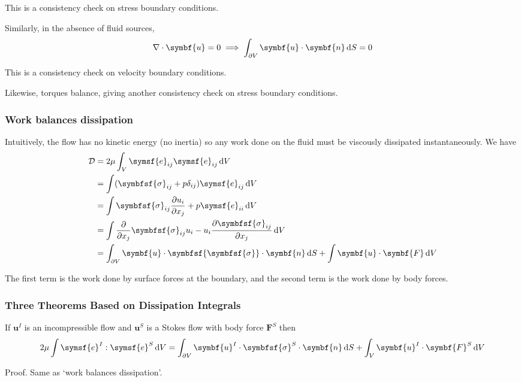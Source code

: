 \documentclass{jknotes}
\begin{document}
This is a consistency check on stress boundary conditions. 

Similarly, in the absence of fluid sources,
\begin{equation}
	\nabla \cdot \symbf{u} = 0 \implies \int_{\partial V} \symbf{u} \cdot \symbf{n} \,
	\diffd S = 0
\end{equation}

This is a consistency check on velocity boundary conditions.

Likewise, torques balance, giving another consistency check on stress boundary
conditions.

\subsubsection{Work balances dissipation}
Intuitively, the flow has no kinetic energy (no inertia)  so any work done on
the fluid must be viscously dissipated instantaneously. We have
\begin{equation}
	\begin{aligned}
		\mathcal{D} &= 2\mu \int_V \symsf{e}_{ij} \symsf{e}_{ij} \, \diffd V \\
				&= \int (\symbfsf{\sigma}_{ij} + p \delta_{ij}) \symsf{e}_{ij} \, \diffd V \\
	&= \int \symbfsf{\sigma}_{ij} \frac{\partial u_i}{\partial x_j} + p \symsf{e}_{ii} \, \diffd V \\
	&= \int \frac{\partial}{\partial x_j} \symbfsf{\sigma}_{ij} u_i - u_i \frac{\partial
	\symbfsf{\sigma}_{ij}}{\partial x_j} \, \diffd V \\
	&= \int_{\partial V} \symbf{u} \cdot \symbfsf{\symbfsf{\sigma}} \cdot \symbf{n} \, \diffd S + \int
	\symbf{u} \cdot \symbf{F} \, \diffd V
	\end{aligned}
\end{equation}

The first term is the work done by surface forces at the boundary, and the
second term is the work done by body forces.

\subsubsection{Three Theorems Based on Dissipation Integrals}
\begin{lemma}
	\label{l1}
	If $\symbf{u}^I$ is an incompressible flow and $\symbf{u}^S$ is a Stokes flow
	with body force $\symbf{F}^S$ then 
	\begin{equation}
		2\mu \int \symsf{e}^{I} : \symsf{e}^{S} \, \diffd V = \int_{\partial V} \symbf{u}^I \cdot
		\symbfsf{\sigma}^S \cdot \symbf{n} \, \diffd S + \int_V \symbf{u}^I \cdot \symbf{F}^S \,
		\diffd V
	\end{equation}
\end{lemma}
Proof. Same as `work balances dissipation'.
\end{document}
